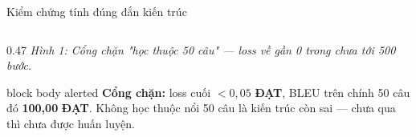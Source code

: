 \documentclass[aspectratio=169, 10pt]{beamer}
\DeclareRobustCommand{\xong}{\textcolor{MLIOTnavy}{\textbf{ĐẠT}}}
\begin{document}
\begin{frame}[shrink=10]{Kiểm chứng tính đúng đắn kiến trúc}
\begin{columns}[T]
\begin{column}{0.47\textwidth}
      {\scriptsize\textit{Hình 1: Cổng chặn "học thuộc 50 câu" — loss về gần 0 trong
      chưa tới 500 bước.}}
      \vspace{0.4em}
      \begin{beamercolorbox}[wd=\textwidth, rounded=true, sep=6pt]{block body alerted}
        {\color{MLIOTink}\scriptsize\textbf{Cổng chặn:} loss cuối $< 0{,}05$
        \xong{}, BLEU trên chính 50 câu đó \textbf{100{,}00} \xong{}. Không học
        thuộc nổi 50 câu là kiến trúc còn sai — chưa qua thì chưa được huấn luyện.}
      \end{beamercolorbox}
    \end{column}
  \end{columns}
\end{frame}


\end{document}

